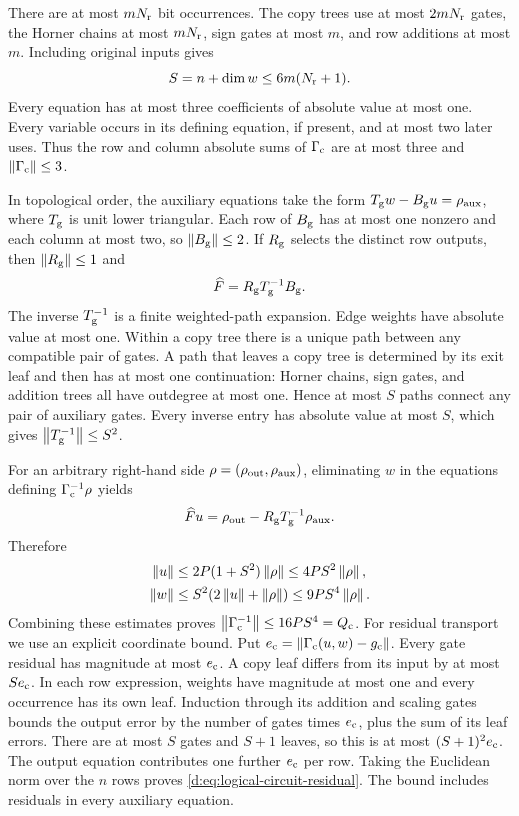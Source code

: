 There are at most $mN_{\rm r}$ bit occurrences. The copy trees use at most
$2mN_{\rm r}$ gates, the Horner chains at most $mN_{\rm r}$, sign gates at most $m$,
and row additions at most $m$. Including original inputs gives
\begin{equation}
 S=n+\dim w\le6m(N_{\rm r}+1).
\end{equation}
Every equation has at most three coefficients of absolute value at
most one. Every variable occurs in its defining equation, if present,
and at most two later uses. Thus the row and column absolute sums of
$\Gamma_{\rm c}$ are at most three and $\left\lVert \Gamma_{\rm c}\right\rVert\le3$.

In topological order, the auxiliary equations take the form
$T_{\rm g}w-B_{\rm g}u=\rho_{\rm aux}$, where $T_{\rm g}$ is unit lower triangular. Each row of
$B_{\rm g}$ has at most one nonzero and each column at most two, so
$\left\lVert B_{\rm g}\right\rVert\le2$. If $R_{\rm g}$ selects the distinct row outputs, then
$\left\lVert R_{\rm g}\right\rVert\le1$ and
\begin{equation}
 \widehat F=R_{\rm g}T_{\rm g}^{-1}B_{\rm g}.
 \label{d:eq:app-circuit-factorization}
\end{equation}
The inverse $T_{\rm g}^{-1}$ is a finite weighted-path expansion. Edge weights
have absolute value at most one. Within a copy tree there is a unique
path between any compatible pair of gates. A path that leaves a copy
tree is determined by its exit leaf and then has at most one
continuation: Horner chains, sign gates, and addition trees all have
outdegree at most one. Hence at most $S$ paths connect any pair of
auxiliary gates. Every inverse entry has absolute value at most $S$,
which gives $\left\lVert T_{\rm g}^{-1}\right\rVert\le S^2$.

For an arbitrary right-hand side $\rho=(\rho_{\rm out},\rho_{\rm aux})$,
eliminating $w$ in the equations defining $\Gamma_{\rm c}^{-1}\rho$ yields
\begin{equation}
 \widehat F u=\rho_{\rm out}-R_{\rm g}T_{\rm g}^{-1}\rho_{\rm aux}.
\end{equation}
Therefore
\begin{align}
 \left\lVert u\right\rVert&\le2P(1+S^2)\left\lVert \rho\right\rVert\le4PS^2\left\lVert \rho\right\rVert,\\
 \left\lVert w\right\rVert&\le S^2(2\left\lVert u\right\rVert+\left\lVert \rho\right\rVert)
             \le9PS^4\left\lVert \rho\right\rVert.
\end{align}
Combining these estimates proves
$\left\lVert \Gamma_{\rm c}^{-1}\right\rVert\le16PS^4=Q_{\rm c}$.
For residual transport we use an explicit coordinate bound. Put
$e_{\rm c}=\left\lVert \Gamma_{\rm c}(u,w)-g_{\rm c}\right\rVert$. Every gate residual has magnitude at most $e_{\rm c}$.
A copy leaf differs from its input by at most $Se_{\rm c}$. In each row expression,
weights have magnitude at most one and every occurrence has its own leaf.
Induction through its addition and scaling gates bounds the output error
by the number of gates times $e_{\rm c}$, plus the sum of its leaf errors. There
are at most $S$ gates and $S+1$ leaves, so this is at most $(S+1)^2e_{\rm c}$.
The output equation contributes one further $e_{\rm c}$ per row. Taking the
Euclidean norm over the $n$ rows proves
\eqref{d:eq:logical-circuit-residual}. The bound includes residuals in
every auxiliary equation.

